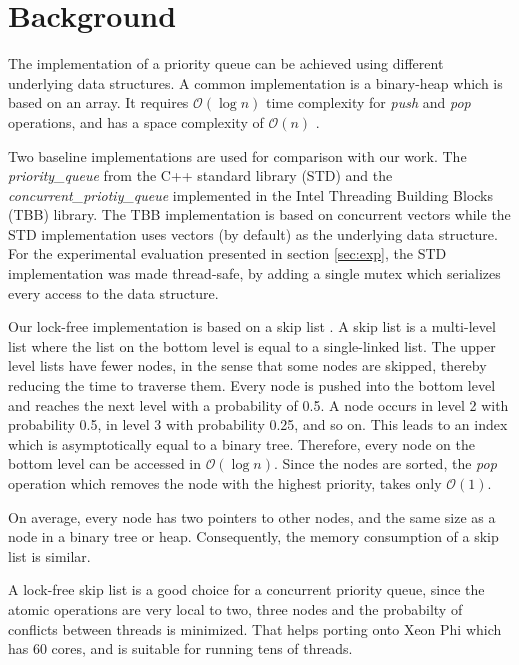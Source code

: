 \section{Background}
\label{sec:background}

The implementation of a priority queue can be achieved using different underlying data structures.
A common implementation is a binary-heap which is based on an array. It requires $\mathcal{O}(\log{}n)$ time complexity for \textit{push} and \textit{pop} operations, and has a space complexity of $\mathcal{O}(n)$ .

Two baseline implementations are used for comparison with our work.
The \textit{priority\_queue} from the C++ standard library (STD) and the \textit{concurrent\_priotiy\_queue} implemented in the Intel Threading Building Blocks (TBB) library.
The TBB implementation is based on concurrent vectors while the STD implementation uses vectors (by default) as the underlying data structure.
For the experimental evaluation presented in section \ref{sec:exp}, the STD implementation was made thread-safe, by adding a single mutex which serializes every access to the data structure.

Our lock-free implementation is based on a skip list \cite{Pugh:1990:SLP:78973.78977}.
A skip list is a multi-level list where the list on the bottom level is equal to a single-linked list.
The upper level lists have fewer nodes, in the sense that some nodes are skipped, thereby reducing the time to traverse them.
Every node is pushed into the bottom level and reaches the next level with a probability of 0.5.
A node occurs in level 2 with probability 0.5, in level 3 with probability 0.25, and so on.
This leads to an index which is asymptotically equal to a binary tree.
Therefore, every node on the bottom level can be accessed in $\mathcal{O}(\log{}n)$.
Since the nodes are sorted, the \textit{pop} operation which removes the node with the highest priority, takes only $\mathcal{O}(1)$.

On average, every node has two pointers to other nodes, and the same size as a node in a binary tree or heap.
Consequently, the memory consumption of a skip list is similar.

A lock-free skip list is a good choice for a concurrent priority queue, since the atomic operations are very local to two, three nodes and the probabilty of conflicts between threads is minimized.
That helps porting onto Xeon Phi which has 60 cores, and is suitable for running tens of threads.
